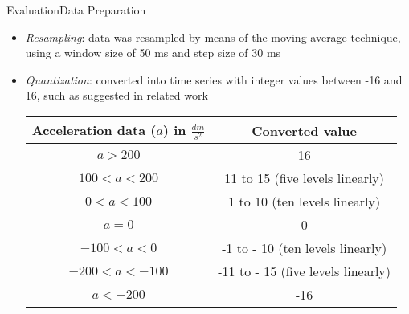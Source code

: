 \begin{frame}{Evaluation}{Data Preparation}
    \begin{itemize}
        \item \textit{Resampling}: data was resampled by means of the moving average technique, using a window size of 50 ms and step size of 30 ms
        \item \textit{Quantization}: converted into time series with integer values between -16 and 16, such as suggested in related work \cite{liu2009uwave}\\
        \begin{center}
            \tiny
            \begin{tabular}{cc}
                \hline
                \textbf{Acceleration data ($a$) in $\frac{dm}{s^2}$} & \textbf{Converted value}\\
                \hline
                $a > 200$ & 16\\
                $100 < a < 200$ & 11 to 15 (five levels linearly)\\
                $0 < a < 100$ & 1 to 10 (ten levels linearly)\\
                $a = 0$ & 0\\
                $-100 < a < 0$ & -1 to - 10 (ten levels linearly)\\
                $-200 < a < -100$ & -11 to - 15 (five levels linearly)\\
                $a < -200$ & -16\\
                \hline
            \end{tabular}
        \end{center}
    \end{itemize}
\end{frame}

